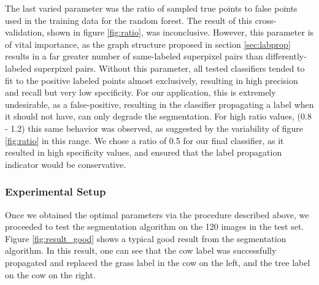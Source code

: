 \documentclass{article} %
\begin{document}
The last varied parameter was the ratio of sampled true points to false points used in the training data for the random forest.
The result of this cross-validation, shown in figure \ref{fig:ratio}, was inconclusive.
However, this parameter is of vital importance, as the graph structure proposed in section \ref{sec:labprop} results in a far greater number of same-labeled superpixel pairs than differently-labeled superpixel pairs.
Without this parameter, all tested classifiers tended to fit to the positive labeled points almost exclusively, resulting in high precision and recall but very low specificity. 
For our application, this is extremely undesirable, as a false-positive, resulting in the classifier propagating a label when it should not have, can only degrade the segmentation. 
For high ratio values, (0.8 - 1.2) this same behavior was observed, as suggested by the variability of figure \ref{fig:ratio} in this range. We chose a ratio of 0.5 for our final classifier, as it resulted in high specificity values, and ensured that the label propagation indicator would be conservative. 

\subsubsection{Experimental Setup}
Once we obtained the optimal parameters via the procedure described above, we proceeded to test the segmentation algorithm on the 120 images in the test set. Figure \ref{fig:result_good} shows a typical good result from the segmentation algorithm. In this result, one can see that the cow label was successfully propagated and replaced the grass label in the cow on the left, and the tree label on the cow on the right.
\end{document}

